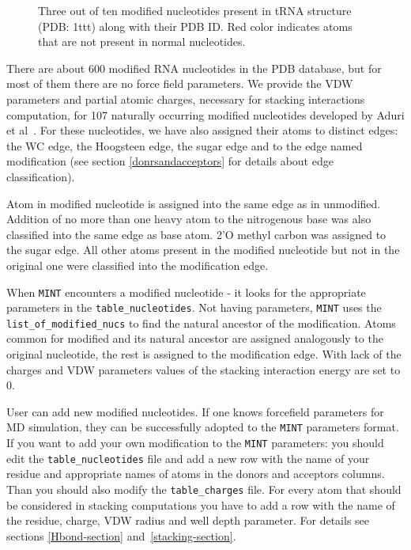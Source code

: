\documentclass[12pt]{article}
\begin{document}
\begin{figure}[h!]
\begin{center}
\end{center}
\caption{Three out of ten modified nucleotides present in tRNA structure (PDB: 1ttt) along with their PDB ID. Red color indicates atoms that are not present in normal nucleotides. }
\label{ModifiedNucleotides}
\end{figure}

There are about 600 modified RNA nucleotides in the PDB database, but for most of them there are no force field parameters. We provide the VDW parameters and partial atomic charges, necessary for stacking interactions computation, for 107 naturally occurring modified nucleotides developed by Aduri et al~\cite{Aduri_2007}. For these nucleotides, we have also assigned their atoms to distinct edges: the WC edge, the Hoogsteen edge, the sugar edge and to the edge named modification (see section \ref{donrsandacceptors} for details about edge classification). 

Atom in modified nucleotide is assigned into the same edge as in unmodified. Addition of no more than one heavy atom to the nitrogenous base was also classified into the same edge as base atom. 2'O methyl carbon was assigned to the sugar edge. All other atoms present in the modified nucleotide but not in the original one were classified into the modification edge.

When {\tt MINT} encounters a modified nucleotide - it looks for the appropriate parameters in the {\tt table\_nucleotides}. Not having parameters, {\tt MINT} uses the \texttt{list\_of\_modified\_nucs} to find the natural ancestor of the modification. Atoms common for modified and its natural ancestor are assigned analogously to the original nucleotide, the rest is assigned to the modification edge. With lack of the charges and VDW parameters values of the stacking interaction energy are set to 0.

User can add new modified nucleotides. If one knows forcefield parameters for MD simulation, they can be successfully adopted to the {\tt MINT} parameters format. If you want to add your own modification to the {\tt MINT} parameters: you should edit the {\tt table\_nucleotides} file and add a new row with the name of your residue and appropriate names of atoms in the donors and acceptors columns. Than you should also modify the \texttt{table\_charges} file. For every atom that should be considered in stacking computations you have to add a row with the name of the residue, charge, VDW radius and well depth parameter. For details see sections \ref{Hbond-section} and~\ref{stacking-section}.
\end{document}
